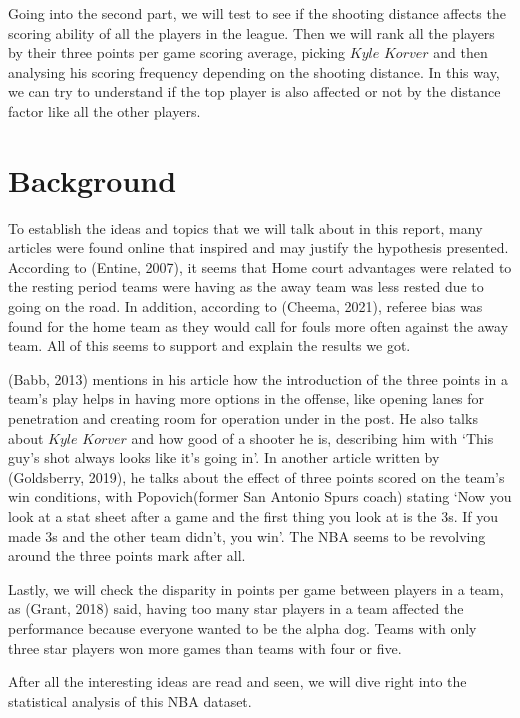 \documentclass[
  12pt,
]{article}
\begin{document}
Going into the second part, we will test to see if the shooting distance affects the scoring ability of all the players in the league. Then we will rank all the players by their three points per game scoring average, picking \(Kyle\) \(Korver\) and then analysing his scoring frequency depending on the shooting distance. In this way, we can try to understand if the top player is also affected or not by the distance factor like all the other players.

\hypertarget{background}{%
\section{Background}\label{background}}

To establish the ideas and topics that we will talk about in this report, many articles were found online that inspired and may justify the hypothesis presented.
According to (Entine, 2007), it seems that Home court advantages were related to the resting period teams were having as the away team was less rested due to going on the road. In addition, according to (Cheema, 2021), referee bias was found for the home team as they would call for fouls more often against the away team. All of this seems to support and explain the results we got.

(Babb, 2013) mentions in his article how the introduction of the three points in a team's play helps in having more options in the offense, like opening lanes for penetration and creating room for operation under in the post. He also talks about \(Kyle\) \(Korver\) and how good of a shooter he is, describing him with `This guy's shot always looks like it's going in'. In another article written by (Goldsberry, 2019), he talks about the effect of three points scored on the team's win conditions, with Popovich(former San Antonio Spurs coach) stating `Now you look at a stat sheet after a game and the first thing you look at is the 3s. If you made 3s and the other team didn't, you win'. The NBA seems to be revolving around the three points mark after all.

Lastly, we will check the disparity in points per game between players in a team, as (Grant, 2018) said, having too many star players in a team affected the performance because everyone wanted to be the alpha dog. Teams with only three star players won more games than teams with four or five.

After all the interesting ideas are read and seen, we will dive right into the statistical analysis of this NBA dataset.
\end{document}
